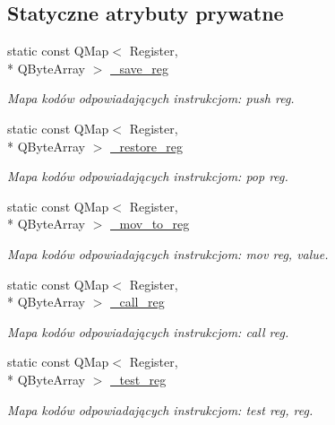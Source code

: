 \subsection*{Statyczne atrybuty prywatne}
\begin{DoxyCompactItemize}
\item 
static const Q\-Map$<$ Register, \\*
Q\-Byte\-Array $>$ \hyperlink{class_code_defines_a7adc87b5303b856416d50e6c2cad8b6d}{\-\_\-save\-\_\-reg}
\begin{DoxyCompactList}\small\item\em Mapa kodów odpowiadających instrukcjom\-: push reg. \end{DoxyCompactList}\item 
static const Q\-Map$<$ Register, \\*
Q\-Byte\-Array $>$ \hyperlink{class_code_defines_a51318323f5ac7e9fa178aaa82db83c29}{\-\_\-restore\-\_\-reg}
\begin{DoxyCompactList}\small\item\em Mapa kodów odpowiadających instrukcjom\-: pop reg. \end{DoxyCompactList}\item 
static const Q\-Map$<$ Register, \\*
Q\-Byte\-Array $>$ \hyperlink{class_code_defines_ae1ef8890be45feca92a5b70f11731192}{\-\_\-mov\-\_\-to\-\_\-reg}
\begin{DoxyCompactList}\small\item\em Mapa kodów odpowiadających instrukcjom\-: mov reg, value. \end{DoxyCompactList}\item 
static const Q\-Map$<$ Register, \\*
Q\-Byte\-Array $>$ \hyperlink{class_code_defines_a59f2b3aeeb03478021af6c8d9beabde6}{\-\_\-call\-\_\-reg}
\begin{DoxyCompactList}\small\item\em Mapa kodów odpowiadających instrukcjom\-: call reg. \end{DoxyCompactList}\item 
static const Q\-Map$<$ Register, \\*
Q\-Byte\-Array $>$ \hyperlink{class_code_defines_adb44763cfb70769e6ab1071efdb380fa}{\-\_\-test\-\_\-reg}
\begin{DoxyCompactList}\small\item\em Mapa kodów odpowiadających instrukcjom\-: test reg, reg. \end{DoxyCompactList}\item 

\end{DoxyCompactItemize}
